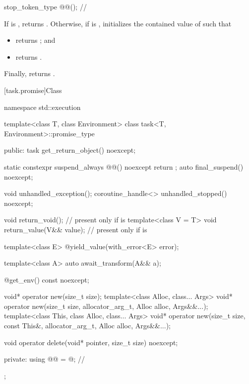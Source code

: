 %
\begin{itemdecl}
stop_token_type @@();           // \expos
\end{itemdecl}
\begin{itemdescr}
\pnum
\effects
If
is ,
returns .
Otherwise, if  is ,
initializes the contained value of  such that
\begin{itemize}
\item
{} returns
;\linebreak
and
\item
{} returns
.
\end{itemize}
Finally, returns .
\end{itemdescr}

[task.promise]{Class }

\begin{codeblock}
namespace std::execution {
  template<class T, class Environment>
  class task<T, Environment>::promise_type {
  public:
    task get_return_object() noexcept;

    static constexpr suspend_always @@() noexcept { return {}; }
    auto final_suspend() noexcept;

    void unhandled_exception();
    coroutine_handle<> unhandled_stopped() noexcept;

    void return_void();                 // present only if  is 
    template<class V = T>
      void return_value(V&& value);     // present only if  is 

    template<class E>
      @\unspec@ yield_value(with_error<E> error);

    template<class A>
      auto await_transform(A&& a);

    @\unspec@ get_env() const noexcept;

    void* operator new(size_t size);
    template<class Alloc, class... Args>
      void* operator new(size_t size, allocator_arg_t, Alloc alloc, Args&&...);
    template<class This, class Alloc, class... Args>
      void* operator new(size_t size, const This&, allocator_arg_t, Alloc alloc, Args&&...);

    void operator delete(void* pointer, size_t size) noexcept;

  private:
    using @@ = @\seebelownc@;    // \expos
  };
}
\end{codeblock}

